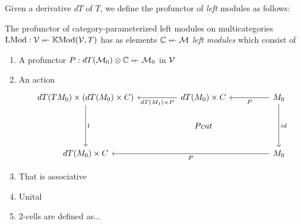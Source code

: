 \documentclass{article}
\begin{document}
Given a derivative $dT$ of $T$, we define the profunctor of
\emph{left} modules as follows:

\begin{definition}
  The profunctor of category-parameterized left modules on
  multicategories $\text{LMod} : \mathcal V \nleftarrow \mathbb{K}\text{Mod}(\mathcal{V},T)$ has as elements
  $\mathbb C \nleftarrow \mathcal M$ \emph{left modules} which consist of
  \begin{enumerate}
  \item A profunctor $P : dT(\mathcal M_0) \otimes \mathbb C \nleftarrow \mathcal M_0$ in $\mathcal V$
  \item An action \[\begin{tikzcd}
dT(TM_0) \times (dT(M_0) \times C) \arrow[dd, "l"] &  & dT(M_0) \times C \arrow[ll, "dT(M_1) \times P"] &  & M_0 \arrow[dd, "id"] \arrow[ll, "P"] \\
 &  & Pcut &  &  \\
dT(M_0) \times C &  &  &  & M_0 \arrow[llll, "P"]
  \end{tikzcd}\]
  \item That is associative
  \item Unital
  \item 2-cells are defined as...
  \end{enumerate}
\end{definition}
\end{document}
